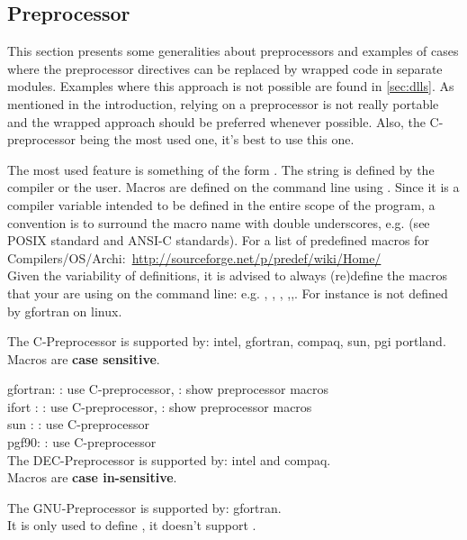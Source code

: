 \documentclass{article}
\begin{document}
\subsection{Preprocessor}
\label{sec:preprocessor}
This section presents some generalities about preprocessors and examples of cases where the preprocessor directives can be replaced by wrapped code in separate modules.
Examples where this approach is not possible are found in \autoref{sec:dlls}.
As mentioned in the introduction, relying on a preprocessor is not really portable and the wrapped approach should be preferred whenever possible. Also, the C-preprocessor being the most used one, it's best to use this one.

The most used feature is something of the form .
The string  is defined by the compiler or the user.
Macros are defined on the command line using . Since it is a compiler variable intended to be defined in the entire scope of the program, a convention is to surround the macro name with double underscores, e.g.  (see POSIX standard and ANSI-C standards).
For a list of predefined macros for Compilers/OS/Archi:~\url{http://sourceforge.net/p/predef/wiki/Home/}\\
Given the variability of definitions, it is advised to always (re)define the macros that your are using on the command line: e.g. , , , ,,. For instance  is not defined by gfortran on linux.

The C-Preprocessor is supported by: intel, gfortran, compaq, sun, pgi portland.\\
Macros are \textbf{case sensitive}.

gfortran: 
: use C-preprocessor,
: show preprocessor macros\\
ifort :
: use C-preprocessor,
: show preprocessor macros\\
sun :
: use C-preprocessor\\
pgf90:
 : use C-preprocessor\\
%
The DEC-Preprocessor is supported by: intel and compaq.\\
Macros are \textbf{case in-sensitive}.

The GNU-Preprocessor is supported by: gfortran.\\
It is only used to define , it doesn't support .\\
\end{document}
